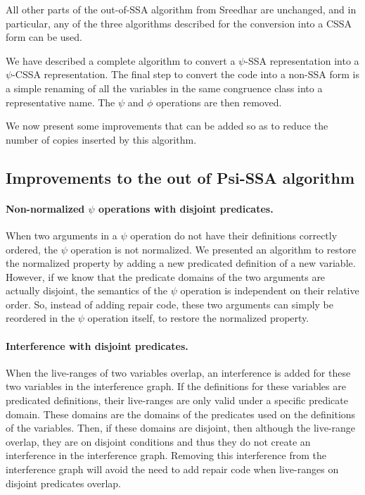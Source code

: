All other parts of the out-of-SSA algorithm from Sreedhar are
unchanged, and in particular, any of the three algorithms described
for the conversion into a CSSA form can be used.

We have described a complete algorithm to convert a $\psi$-SSA
representation into a $\psi$-CSSA representation. The final step to
convert the code into a non-SSA form is a simple renaming of all the
variables in the same congruence class into a representative name. The
$\psi$ and $\phi$ operations are then removed.

We now present some improvements that can be added so as to reduce
the number of copies inserted by this algorithm.

\subsection{Improvements to the out of Psi-SSA algorithm}

\paragraph{Non-normalized $\psi$ operations with disjoint predicates.}
When two arguments in a $\psi$ operation do not have their definitions
correctly ordered, the $\psi$ operation is not normalized. We
presented an algorithm to restore the normalized property by adding a
new predicated definition of a new variable. However, if we know that
the predicate domains of the two arguments are actually disjoint, the
semantics of the $\psi$ operation is independent on their relative
order. So, instead of adding repair code, these two arguments can
simply be reordered in the $\psi$ operation itself, to restore the
normalized property.

\paragraph{Interference with disjoint predicates.}
When the live-ranges of two variables overlap, an interference is
added for these two variables in the interference graph. If the
definitions for these variables are predicated definitions, their
live-ranges are only valid under a specific predicate domain. These
domains are the domains of the predicates used on the definitions of
the variables. Then, if these domains are disjoint, then although the
live-range overlap, they are on disjoint conditions and thus they do
not create an interference in the interference graph. Removing this
interference from the interference graph will avoid the need to add repair code
when live-ranges on disjoint predicates overlap.

